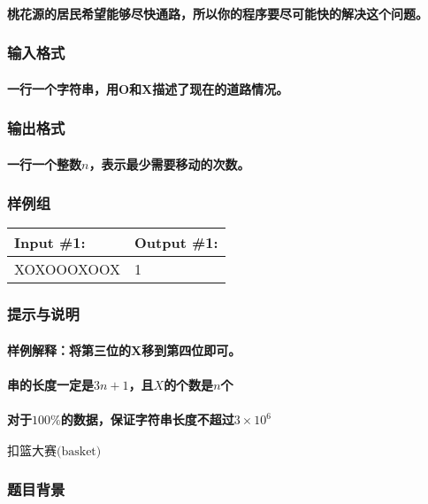 \documentclass[final,11pt,oneside,UTF8]{report}
\begin{document}
\paragraph{桃花源的居民希望能够尽快通路，所以你的程序要尽可能快的解决这个问题。}
\subsubsection{输入格式}
\paragraph{一行一个字符串，用O和X描述了现在的道路情况。}
\subsubsection{输出格式}
\paragraph{一行一个整数$n$，表示最少需要移动的次数。}
\subsubsection{样例组}
\begin{table}[H]
    \begin{tabular}{|l|l|}
        \hline
        Input \#1: & Output \#1: \\ \hline
        XOXOOOXOOX & 1           \\ \hline
    \end{tabular}
\end{table}
\subsubsection{提示与说明}
\paragraph{样例解释：将第三位的X移到第四位即可。}
\paragraph{串的长度一定是$3n+1$，且$X$的个数是$n$个}
\paragraph{对于$100\%$的数据，保证字符串长度不超过$3 \times 10^6$}
\newpage
\centerline{\LARGE{$\textbf{扣篮大赛}\text{(basket)}$}}
\subsubsection{题目背景}
\end{document}
